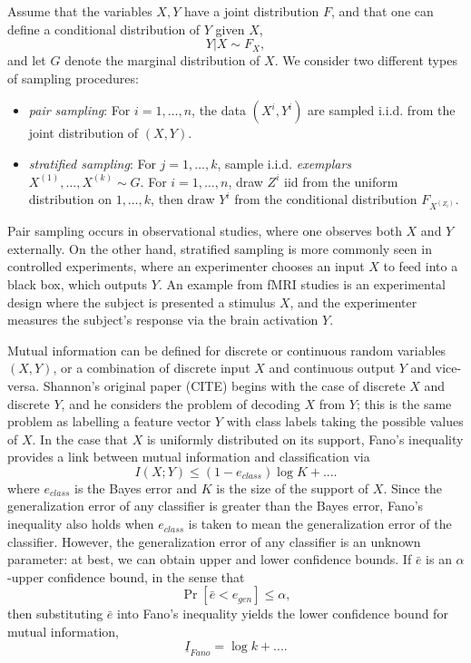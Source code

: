 \documentclass{article}
\begin{document}
Assume that the variables $X, Y$ have a joint distribution $F$, and that one can define a conditional
distribution of $Y$ given $X$,
\[
Y|X \sim F_X,
\]
and let $G$ denote the marginal distribution of $X$.
We consider two different types of sampling procedures:
\begin{itemize}
\item \emph{pair sampling}:  For $i = 1,\hdots, n$, the data $(X^i, Y^i)$ are sampled i.i.d. from the joint distribution of $(X, Y)$.
\item \emph{stratified sampling}:  For $j = 1,\hdots, k$, sample i.i.d. \emph{exemplars} $X^{(1)},\hdots, X^{(k)} \sim G$.  For $i = 1,\hdots, n$, draw $Z^i$ iid from the uniform distribution on $1,\hdots, k$, then draw $Y^i$ from the conditional distribution $F_{X^{(Z_i)}}$.
\end{itemize}
Pair sampling occurs in observational studies, where one observes both $X$ and $Y$ externally.  On the other hand, stratified sampling is more commonly seen in controlled experiments, where an experimenter chooses an input $X$ to feed into a black box, which outputs $Y$.  An example from fMRI studies is an experimental design where the subject is presented a stimulus $X$, and the experimenter measures the subject's response via the brain activation $Y$.

Mutual information can be defined for discrete or continuous random variables $(X, Y)$, or a combination of discrete input $X$ and continuous output $Y$ and vice-versa.  Shannon's original paper (CITE) begins
with the case of discrete $X$ and discrete $Y$, and he considers the problem of decoding $X$ from $Y$;
this is the same problem as labelling a feature vector $Y$ with class labels taking the possible values of $X$.
In the case that $X$ is uniformly distributed on its support, Fano's inequality provides a link between mutual information and classification via
\[I(X; Y) \leq (1-e_{class}) \log K + ....\]
where $e_{class}$ is the Bayes error and $K$ is the size of the support of $X$.  Since the generalization error of any classifier is greater than the Bayes error,
Fano's inequality also holds when $e_{class}$ is taken to mean the generalization error of the classifier.
However, the generalization error of any classifier is an unknown parameter:
at best, we can obtain upper and lower confidence bounds.  If $\bar{e}$ is an $\alpha$-upper confidence bound,
in the sense that
\[
\Pr[\bar{e} < e_{gen}] \leq \alpha,
\]
then substituting $\bar{e}$ into Fano's inequality yields the lower confidence bound for mutual information,
\[
\underline{I}_{Fano} = \log k + ....
\]
\end{document}
